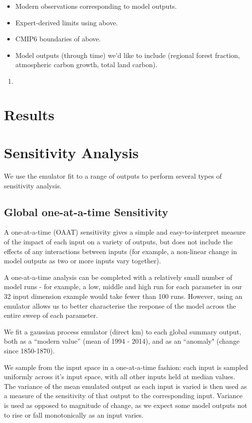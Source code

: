 \documentclass[gmd, manuscript]{copernicus}
\begin{document}
\begin{itemize}
    \item Modern observations corresponding to model outputs.
    \item Expert-derived limits using above.
    \item CMIP6 boundaries of above.
    \item Model outputs (through time) we'd like to include (regional forest fraction, atmospheric carbon growth, total land carbon).
\end{itemize}

\begin{enumerate}
    \item 
\end{enumerate}


\section{Results}



\section{Sensitivity Analysis}
We use the emulator fit to a range of outputs to perform several types of sensitivity analysis.

\subsection{Global one-at-a-time Sensitivity}

A one-at-a-time (OAAT) sensitivity gives a simple and easy-to-interpret measure of the impact of each input on a variety of outputs, but does not include the effects of any interactions between inputs (for example, a non-linear change in model outputs as two or more inputs vary together).  

A one-at-a-time analysis can be completed with a relatively small number of model runs - for example, a low, middle and high run for each parameter in our 32 input dimension example would take fewer than 100 runs. However, using an emulator allows us to better characterise the response of the model across the entire sweep of each parameter.

We fit a gaussian process emulator (direct km) to each global summary output, both as a ``modern value'' (mean of 1994 - 2014), and as an ``anomaly" (change since 1850-1870).

We sample from the input space in a one-at-a-time fashion: each input is sampled uniformly across it's input space, with all other inputs held at median values. The variance of the mean emulated output as each input is varied is then used as a measure of the sensitivity of that output to the corresponding input. Variance is used as opposed to magnitude of change, as we expect some model outputs not to rise or fall monotonically as an input varies.
\end{document}
